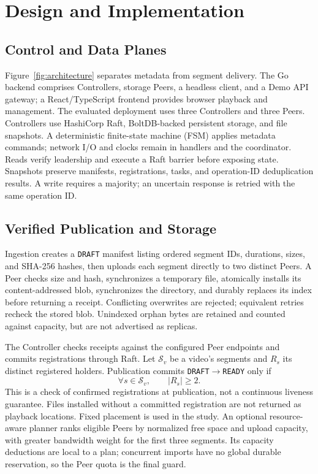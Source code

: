 \section{Design and Implementation}
\label{sec:design}


\subsection{Control and Data Planes}
Figure~\ref{fig:architecture} separates metadata from segment delivery.
The Go backend comprises Controllers, storage Peers, a headless client, and a
Demo API gateway; a React/TypeScript frontend provides browser playback and
management. The evaluated deployment uses three Controllers and three Peers.
Controllers use HashiCorp Raft, BoltDB-backed persistent storage, and file
snapshots. A deterministic finite-state machine (FSM) applies metadata
commands; network I/O and clocks remain in handlers and the coordinator.
Reads verify leadership and execute a Raft barrier before exposing state.
Snapshots preserve manifests, registrations, tasks, and operation-ID
deduplication results. A write requires a majority; an uncertain response is
retried with the same operation ID.

\subsection{Verified Publication and Storage}
Ingestion creates a \texttt{DRAFT} manifest listing ordered segment IDs,
durations, sizes, and SHA-256 hashes, then uploads each segment directly to
two distinct Peers. A Peer checks size and hash, synchronizes a temporary
file, atomically installs its content-addressed blob, synchronizes the
directory, and durably replaces its index before returning a receipt.
Conflicting overwrites are rejected; equivalent retries recheck the stored
blob. Unindexed orphan bytes are retained and counted against capacity,
but are not advertised as replicas.

The Controller checks receipts against the configured Peer endpoints and
commits registrations through Raft. Let $\mathcal{S}_v$ be a video's segments
and $R_s$ its distinct registered holders. Publication commits
\texttt{DRAFT}$\rightarrow$\texttt{READY} only if
\begin{equation}
  \forall s\in\mathcal{S}_v,\qquad |R_s|\geq 2.
  \label{eq:publication}
\end{equation}
This is a check of confirmed registrations at publication, not a continuous
liveness guarantee. Files installed without a committed registration are
not returned as playback locations. Fixed placement is used in the study.
An optional resource-aware planner ranks eligible Peers by normalized free
space and upload capacity, with greater bandwidth weight for the first three
segments. Its capacity deductions are local to a plan; concurrent imports
have no global durable reservation, so the Peer quota is the final guard.

